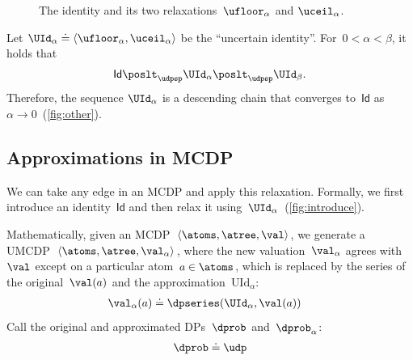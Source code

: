 \begin{figure}[h]
  \hfill{}\hfill{}

  \caption{\label{fig:identity_approximation}The identity and its two relaxations~$\ufloor_{\alpha}$
    and $\uceil_{\alpha}$.}
\end{figure}

Let $\UId_{\alpha}\doteq\left\langle \ufloor_{\alpha},\uceil_{\alpha}\right\rangle $
be the ``uncertain identity''. For~$0<\alpha<\beta$, it holds
that
\[
  \mathsf{Id}\poslt_{\udpsp}\UId_{\alpha}\poslt_{\udpsp}\UId_{\beta}.
\]
Therefore, the sequence $\UId_{\alpha}$ is a descending chain that
converges to~$\mathsf{Id}$ as~$\alpha\rightarrow0$~(\cref{fig:other}).


\subsection{Approximations in MCDP}

We can take any edge in an MCDP and apply this relaxation. Formally,
we first introduce an identity~$\mathsf{Id}$ and then relax it using~$\UId_{\alpha}$~(\cref{fig:introduce}).


Mathematically, given an MCDP~$\left\langle \atoms,\atree,\val\right\rangle $,
we generate a UMCDP~$\left\langle \atoms,\atree,\val_{\alpha}\right\rangle $,
where the new valuation~$\val_{\alpha}$ agrees with~$\val$ except
on a particular atom~$a\in\atoms$, which is replaced by the series
of the original~$\val(a)$ and the approximation~$\text{UId}_{\alpha}$:
\begin{align*}
  \val_{\alpha}(a) & \doteq\dpseries(\UId_{\alpha},\val(a))
\end{align*}
Call the original and approximated DPs~$\dprob$ and~$\dprob_{\alpha}$:
\[
  \begin{array}{ccc}
    \dprob\doteq\udp
\end{array}\]
